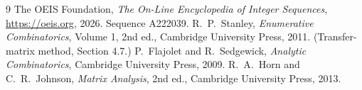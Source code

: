 \documentclass[11pt,a4paper]{article}
\theoremstyle{plain}
\theoremstyle{definition}
\begin{document}
\begin{thebibliography}{9}
 The OEIS Foundation, \emph{The On-Line Encyclopedia of Integer
Sequences}, \url{https://oeis.org}, 2026. Sequence A222039.
 R.~P.~Stanley, \emph{Enumerative Combinatorics}, Volume 1, 2nd ed.,
Cambridge University Press, 2011. (Transfer-matrix method, Section 4.7.)
 P.~Flajolet and R.~Sedgewick, \emph{Analytic Combinatorics}, Cambridge
University Press, 2009.
 R.~A.~Horn and C.~R.~Johnson, \emph{Matrix Analysis}, 2nd ed., Cambridge
University Press, 2013.
\end{thebibliography}
\end{document}
